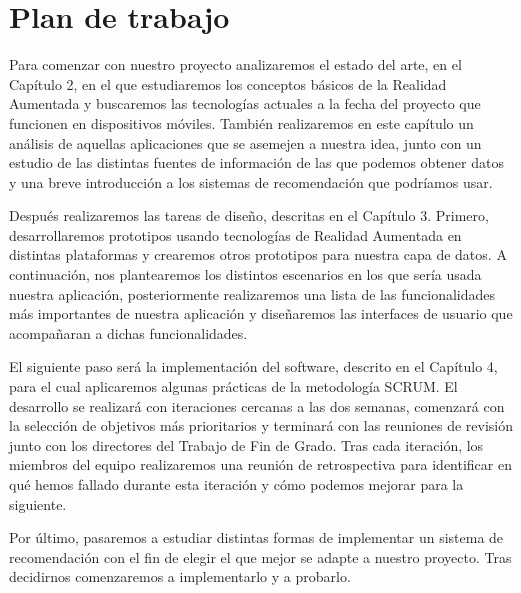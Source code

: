 \section{Plan de trabajo}
\begin{flushleft}
    Para comenzar con nuestro proyecto analizaremos el estado del arte, en el Capítulo 2, en el que estudiaremos los conceptos
     básicos de la Realidad Aumentada y buscaremos las tecnologías actuales a la fecha del proyecto
     que funcionen en dispositivos móviles. También realizaremos en este capítulo un análisis de aquellas aplicaciones que se asemejen
     a nuestra idea, junto con un estudio de las distintas fuentes de información de las que podemos obtener datos y una breve introducción
    a los sistemas de recomendación que podríamos usar.
\end{flushleft}

\begin{flushleft}     
    Después realizaremos las tareas de diseño, descritas en el Capítulo 3. Primero,
    desarrollaremos prototipos usando tecnologías de Realidad Aumentada en distintas plataformas y crearemos otros prototipos para nuestra capa de datos. 
    A continuación, nos plantearemos los distintos
    escenarios en los que sería usada nuestra aplicación, posteriormente realizaremos una lista de las funcionalidades 
    más importantes de nuestra aplicación y diseñaremos las interfaces de usuario que acompañaran a dichas funcionalidades. 
\end{flushleft}

\begin{flushleft}    
    El siguiente paso será la implementación del software, descrito en el Capítulo 4, para el cual aplicaremos
     algunas prácticas de la metodología SCRUM. El desarrollo se realizará
     con iteraciones cercanas a las dos semanas, comenzará con la selección de
     objetivos más prioritarios y terminará con las reuniones de revisión junto
     con los directores del Trabajo de Fin de Grado. Tras cada iteración, los miembros del equipo 
     realizaremos una reunión de retrospectiva para identificar en qué hemos fallado durante esta iteración y
     cómo podemos mejorar para la siguiente.
\end{flushleft}

\begin{flushleft}
    Por último, pasaremos a estudiar distintas formas de implementar un sistema
     de recomendación con el fin de elegir el que mejor se adapte a nuestro proyecto. Tras
     decidirnos comenzaremos a implementarlo y a probarlo.
\end{flushleft}

\label{makereference1.3}



